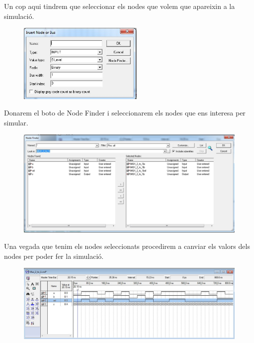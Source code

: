 \documentclass[12pt, a4papre]{article}
\begin{document}
	Un cop aqui tindrem que seleccionar els nodes que volem que apareixin a la simulació.
	\begin{figure}[H]
		\begin{center}
		\includegraphics[width=60mm]{Insertnode.jpeg}
		\end{center}
	\end{figure}
	
	Donarem el boto de  Node Finder i seleccionarem els nodes que ens interesa per simular.
	
		\begin{figure}[H]
		\begin{center}
		\includegraphics[width=150mm]{nodes.jpeg}
		\end{center}
	\end{figure}
	
	Una vegada que tenim els nodes seleccionats procedirem a canviar els valors dels nodes per poder fer la simulació.
	
		\begin{figure}[H]
		\begin{center}
		\includegraphics[width=150mm]{simulacioambvalors.jpeg}
		\end{center}
	\end{figure}
	
\end{document}
